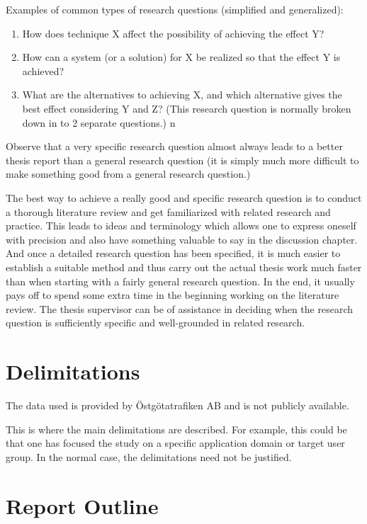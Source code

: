 Examples of common types of research questions (simplified
and generalized):

\begin{enumerate}
\item How does technique X affect the possibility of achieving the
  effect Y?

\item How can a system (or a solution) for X be realized so
  that the effect Y is achieved?

\item What are the alternatives to
  achieving X, and which alternative gives the best effect considering
  Y and Z? (This research question is normally broken down in to 2
  separate questions.)
n
\end{enumerate}

Observe that a very specific research question almost always
leads to a better thesis report than a general research question
(it is simply much more difficult to make something good
from a general research question.)

The best way to achieve a really good and specific research
question is to conduct a thorough literature review and get
familiarized with related research and practice. This leads to
ideas and terminology which allows one to express oneself
with precision and also have something valuable to say in the
discussion chapter. And once a detailed research question
has been specified, it is much easier to establish a suitable
method and thus carry out the actual thesis work much faster
than when starting with a fairly general research question. In
the end, it usually pays off to spend some extra time in the
beginning working on the literature review. The thesis
supervisor can be of assistance in deciding when the research
question is sufficiently specific and well-grounded in related
research.

\section{Delimitations}
\label{sec:delimitations}
The data used is provided by Östgötatrafiken AB and is not publicly
available. 

This is where the main delimitations are described. For
example, this could be that one has focused the study on a
specific application domain or target user group. In the
normal case, the delimitations need not be justified.

\section{Report Outline}
